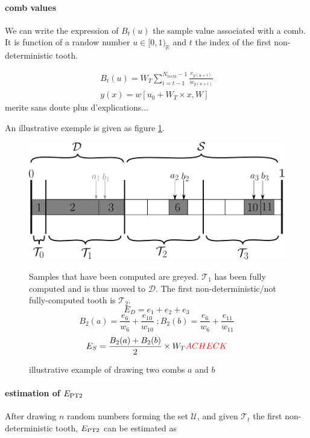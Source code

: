 \documentclass[./thesis.tex]{subfiles}
\begin{document}
\paragraph{comb values}

We can write the expression of $B_t(u)$ the sample value associated with a comb. It is function of a randow number $u \in [0,1)_\mathbb{R}$ and $t$ the index of the first non-deterministic tooth.

\begin{align}
\label{eq:combvalue}
B_t(u) = W_T \sum_{i=t-1}^{N_{teeth}-1} \frac{e_{y(u+i)}}{w_{y(u+i)}} \\
y(x)=w[u_0+ W_T \times x, W]
\end{align}
\alert{merite sans doute plus d'explications...}

An illustrative exemple is given as figure \ref{fig:toothindet}.

 \begin{figure}[h!]
	\begin{center}
		\includegraphics[width=0.9\columnwidth]{figures/pt2/toothindet}
		\caption{illustrative example of drawing two combs $a$ and $b$}
		\label{fig:toothindet}
		Samples that have been computed are greyed. $\mathcal{T}_1$ has been fully computed and is thus moved to $\mathcal{D}$. The first non-deterministic/not fully-computed tooth is $\mathcal{T}_2$.
		$$E_D = e_1 + e_2 + e_3$$
		$$B_2(a) = \frac{e_6}{w_6} + \frac{e_{10}}{w_{10}}\;;B_2(b) = \frac{e_6}{w_6} + \frac{e_{11}}{w_{11}}$$
		$$E_S = \frac{B_2(a)+B_2(b)}{2} \times W_T \textcolor{red}{A CHECK}$$
	\end{center}
\end{figure}

\paragraph{estimation of $E_\text{PT2}$}

After drawing $n$ random numbers forming the set $\mathcal{U}$, and given $\mathcal{T}_t$ the first non-deterministic tooth, $E_\text{PT2}$ can be estimated as 
\end{document}
